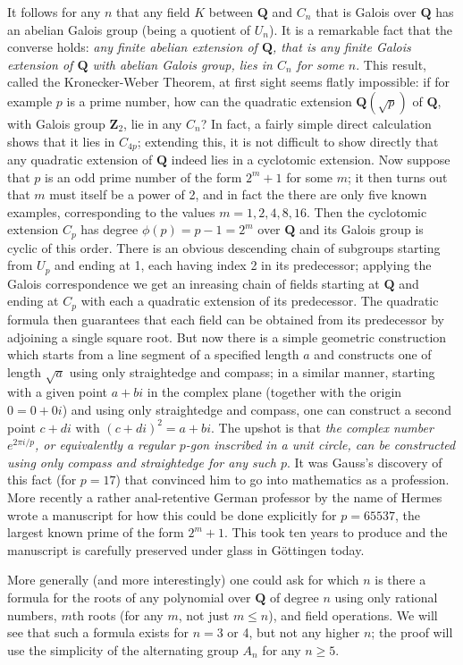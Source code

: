 \documentclass[10pt]{article}
\begin{document}
It follows for any $n$ that any field $K$ between $\mathbf Q$ and $C_n$
that is Galois over $\mathbf Q$ has an abelian Galois group (being a
quotient of $U_n$). It is a remarkable fact that the converse holds:
{\sl any finite abelian extension of $\mathbf Q$, that is any finite
  Galois extension of $\mathbf Q$ with abelian Galois group, lies in
  $C_n$ for some $n$}. This result, called the Kronecker-Weber Theorem,
at first sight seems flatly impossible: if for example $p$ is a prime
number, how can the quadratic extension $\mathbf Q(\sqrt{p})$ of
$\mathbf Q$, with Galois group $\mathbf Z_2$, lie in any $C_n$? In fact,
a fairly simple direct calculation shows that it lies in $C_{4p}$;
extending this, it is not difficult to show directly that any quadratic
extension of $\mathbf Q$ indeed lies in a cyclotomic extension. Now
suppose that $p$ is an odd prime number of the form $2^m + 1$ for some
$m$; it then turns out that $m$ must itself be a power of 2, and in fact
the there are only five known examples, corresponding to the values
$m=1,2,4,8,16$. Then the cyclotomic extension $C_p$ has degree $\phi(p)
= p-1 = 2^m$ over $\mathbf Q$ and its Galois group is cyclic of this
order. There is an obvious descending chain of subgroups starting from
$U_p$ and ending at 1, each having index 2 in its predecessor; applying
the Galois correspondence we get an inreasing chain of fields starting
at $\mathbf Q$ and ending at $C_p$ with each a quadratic extension of
its predecessor. The quadratic formula then guarantees that each field
can be obtained from its predecessor by adjoining a single square root.
But now there is a simple geometric construction which starts from a
line segment of a specified length $a$ and constructs one of length
$\sqrt{a}$ using only straightedge and compass; in a similar manner,
starting with a given point $a+bi$ in the complex plane (together with
the origin $0 = 0 + 0i$) and using only straightedge and compass, one
can construct a second point $c+di$ with $(c+di)^2 = a+bi$. The upshot
is that {\sl the complex number $e^{2\pi i/p}$, or equivalently a
  regular $p$-gon inscribed in a unit circle, can be constructed using
  only compass and straightedge for any such $p$}. It was Gauss's
discovery of this fact (for $p=17$) that convinced him to go into
mathematics as a profession. More recently a rather anal-retentive
German professor by the name of Hermes wrote a manuscript for how this
could be done explicitly for $p = 65537$, the largest known prime of the
form $2^m + 1$. This took ten years to produce and the manuscript is
carefully preserved under glass in G\"ottingen today.

More generally (and more interestingly) one could ask for which $n$ is
there a formula for the roots of any polynomial over $\mathbf Q$ of
degree $n$ using only rational numbers, $m$th roots (for any $m$, not
just $m\le n$), and field operations. We will see that such a formula
exists for $n=3$ or 4, but not any higher $n$; the proof will use the
simplicity of the alternating group $A_n$ for any $n\ge5$.
\end{document}

